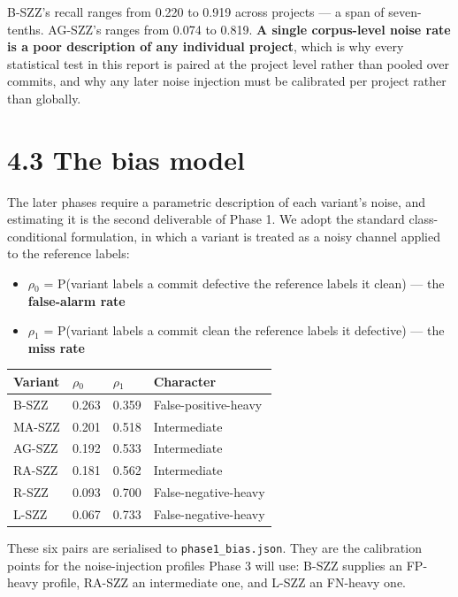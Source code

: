 B-SZZ's recall ranges from 0.220 to 0.919 across projects --- a span of
seven-tenths. AG-SZZ's ranges from 0.074 to 0.819. \textbf{A single
corpus-level noise rate is a poor description of any individual
project}, which is why every statistical test in this report is paired
at the project level rather than pooled over commits, and why any later
noise injection must be calibrated per project rather than globally.

\section{4.3 The bias model}\label{the-bias-model}

The later phases require a parametric description of each variant's
noise, and estimating it is the second deliverable of Phase 1. We adopt
the standard class-conditional formulation, in which a variant is
treated as a noisy channel applied to the reference labels:

\begin{itemize}
\tightlist
\item
  \textbf{\ensuremath{\rho}\ensuremath{_0}} = P(variant labels a commit defective \textbar{} the
  reference labels it clean) --- the \textbf{false-alarm rate}
\item
  \textbf{\ensuremath{\rho}\ensuremath{_1}} = P(variant labels a commit clean \textbar{} the reference
  labels it defective) --- the \textbf{miss rate}
\end{itemize}

\begin{longtable}[]{@{}llll@{}}
\toprule\noalign{}
Variant & \ensuremath{\rho}\ensuremath{_0} & \ensuremath{\rho}\ensuremath{_1} & Character \\
\midrule\noalign{}
\endhead
\bottomrule\noalign{}
\endlastfoot
B-SZZ & 0.263 & 0.359 & False-positive-heavy \\
MA-SZZ & 0.201 & 0.518 & Intermediate \\
AG-SZZ & 0.192 & 0.533 & Intermediate \\
RA-SZZ & 0.181 & 0.562 & Intermediate \\
R-SZZ & 0.093 & 0.700 & False-negative-heavy \\
L-SZZ & 0.067 & 0.733 & False-negative-heavy \\
\end{longtable}

These six pairs are serialised to \texttt{phase1\_bias.json}. They are
the calibration points for the noise-injection profiles Phase 3 will
use: B-SZZ supplies an FP-heavy profile, RA-SZZ an intermediate one, and
L-SZZ an FN-heavy one.

